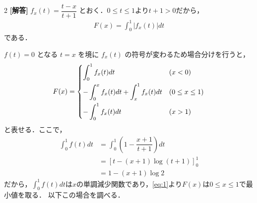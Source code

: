 \documentclass[../../main.tex]{subfiles}
\begin{document}
\setcounter{equation}{0}
\setcounter{figure}{0}
\setcounter{table}{0}
\begin{oframed}
  
\end{oframed}
\setlength{\columnseprule}{0.4pt}
\begin{multicols}{2}
  {\bf [解答]}
  $f_{x}(t) = \dfrac{t-x}{t+1}$ とおく．$0\le t\le 1$より$t+1>0$だから，
  \begin{align}
    F(x) = \int_{0}^{1} \left|f_{x}(t)\right| dt
  \end{align}
  である．

  $f(t)=0$ となる $t=x$ を境に $f_{x}(t)$ の符号が変わるため場合分けを行うと，
  \begin{align}\label{eq:1}
    F(x) =
    \begin{dcases}
      \int_{0}^{1} f_{x}(t) dt                             & (x<0)           \\
      -\int_{0}^{x} f_{x}(t) dt + \int_{x}^{1} f_{x}(t) dt & (0 \le x \le 1) \\
      -\int_{0}^{1} f_{x}(t) dt                            & (x>1)
    \end{dcases}
  \end{align}
  と表せる．ここで，
  \begin{align}
    \int_{0}^{1} f(t) dt
    & = \int_{0}^{1} \left(1-\dfrac{x+1}{t+1}\right) dt \\
    & = \left[t - (x+1)\log(t+1)\right]_{0}^{1}        \\
    & = 1 - (x+1)\log 2
  \end{align}
  だから，$\displaystyle\int_{0}^{1} f(t) dt$は$x$の単調減少関数であり，\cref{eq:1}より$F(x)$は$0\le x \le 1$で最小値を取る．
  以下この場合を調べる．


\end{multicols}
\end{document}
